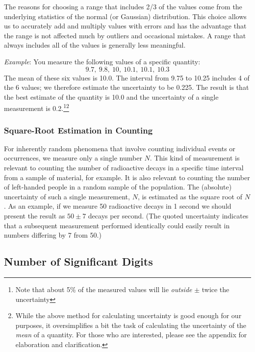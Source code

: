 \documentclass{article}
\begin{document}
The reasons for choosing a range that includes 2/3 of the values come from the underlying statistics of the normal (or Gaussian) distribution. This choice allows us to accurately add and multiply values with errors and has the advantage that the range is not affected much by outliers and occasional mistakes. A range that always includes all of the values is generally less meaningful. \myskip

\emph{Example}: You measure the following values of a specific quantity:
\begin{equation*}
    9.7,\:9.8,\:10,\:10.1,\:10.1,\:10.3
\end{equation*}
The mean of these six values is 10.0. The interval from 9.75 to 10.25 includes 4 of the 6 values; we therefore estimate the uncertainty to be 0.225. The result is that the best estimate of the quantity is 10.0 and the uncertainty of a single measurement is 0.2.\footnote{Note that about 5\% of the measured values will lie \emph{outside} $\pm$ twice the uncertainty}\footnote{While the above method for calculating uncertainty is good enough for our purposes, it oversimplifies a bit the task of calculating the uncertainty of the \emph{mean} of a quantity.  For those who are interested, please see the appendix for elaboration and clarification. }

\subsubsection{Square-Root Estimation in Counting}

For inherently random phenomena that involve counting individual events or occurrences, we measure only a single number $N$. This kind of measurement is relevant to counting the number of radioactive decays in a specific time interval from a sample of material, for example. It is also relevant to counting the number of left-handed people in a random sample of the population. The (absolute) uncertainty of such a single measurement, $N$, is estimated as the square root of $N$. As an example, if we measure 50 radioactive decays in 1 second we should present the result as $50\pm 7$ decays per second. (The quoted uncertainty indicates that a subsequent measurement performed identically could easily result in numbers differing by 7 from 50.)

\subsection{Number of Significant Digits}
\end{document}
